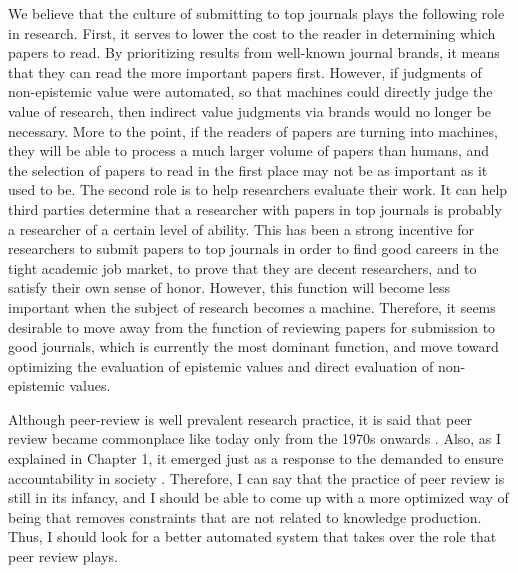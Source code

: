 \documentclass{book}
\begin{document}
We believe that the culture of submitting to top journals plays the following role in research. First, it serves to lower the cost to the reader in determining which papers to read. By prioritizing results from well-known journal brands, it means that they can read the more important papers first. However, if judgments of non-epistemic value were automated, so that machines could directly judge the value of research, then indirect value judgments via brands would no longer be necessary. More to the point, if the readers of papers are turning into machines, they will be able to process a much larger volume of papers than humans, and the selection of papers to read in the first place may not be as important as it used to be. The second role is to help researchers evaluate their work. It can help third parties determine that a researcher with papers in top journals is probably a researcher of a certain level of ability. This has been a strong incentive for researchers to submit papers to top journals in order to find good careers in the tight academic job market, to prove that they are decent researchers, and to satisfy their own sense of honor. However, this function will become less important when the subject of research becomes a machine. Therefore, it seems desirable to move away from the function of reviewing papers for submission to good journals, which is currently the most dominant function, and move toward optimizing the evaluation of epistemic values and direct evaluation of non-epistemic values.

Although peer-review is well prevalent research practice, it is said that peer review became commonplace like today only from the 1970s onwards \cite{baldwin2018scientific}. Also, as I explained in Chapter 1, it emerged just as a response to the demanded to ensure accountability in society \cite{baldwin2018scientific}. Therefore, I can say that the practice of peer review is still in its infancy, and I should be able to come up with a more optimized way of being that removes constraints that are not related to knowledge production. Thus, I should look for a better automated system that takes over the role that peer review plays.


\end{document}
